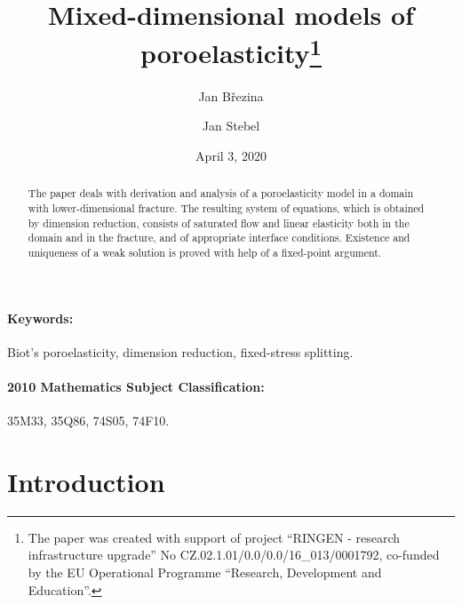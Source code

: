 \documentclass[a4paper]{article}
\numberwithin{equation}{section}
\begin{document}
\title{Mixed-dimensional models of poroelasticity\thanks{The paper was created with support of project ``RINGEN - research
infrastructure upgrade'' No CZ.02.1.01/0.0/0.0/16\_013/0001792,
co-funded by the EU Operational Programme ``Research, Development and Education''.}}
\author{Jan Březina}
\author{Jan Stebel}
\date{April 3, 2020}
\maketitle

\begin{abstract}
The paper deals with derivation and analysis of a poroelasticity model in a domain with lower-dimensional fracture.
The resulting system of equations, which is obtained by dimension reduction, consists of saturated flow and linear elasticity both in the domain and in the fracture, and of appropriate interface conditions.
Existence and uniqueness of a weak solution is proved with help of a fixed-point argument.
\end{abstract}

\paragraph{Keywords:}
Biot's poroelasticity, dimension reduction, fixed-stress splitting.

\paragraph{2010 Mathematics Subject Classification:}
35M33, %
35Q86, %
74S05, %
74F10. %


\section{Introduction}
\end{document}
